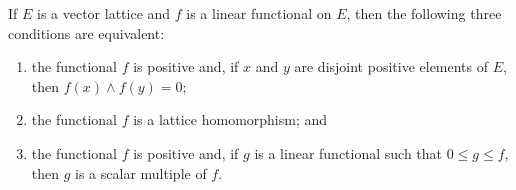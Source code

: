 If $E$ is a vector lattice and $f$ is a linear functional on $E$, then the following three conditions are equivalent:
\begin{enumerate}
\item[(i)] the functional $f$ is positive and, if $x$ and $y$ are disjoint positive elements of $E$, then $f(x) \wedge f(y) = 0$;
\item[(ii)] the functional $f$ is a lattice homomorphism; and
\item[(iii)] the functional $f$ is positive and, if $g$ is a linear functional such that $0 \leq g \leq f$, then $g$ is a scalar multiple of $f$.
\end{enumerate}
